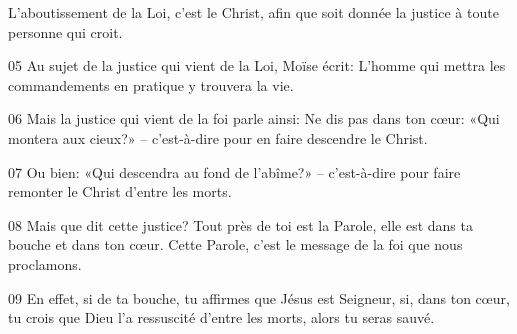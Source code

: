 L’aboutissement de la Loi, c’est le Christ, afin que soit donnée la justice à toute personne qui croit.

05 Au sujet de la justice qui vient de la Loi, Moïse écrit: L’homme qui mettra les commandements en pratique y trouvera la vie.

06 Mais la justice qui vient de la foi parle ainsi: Ne dis pas dans ton cœur: «Qui montera aux cieux?» – c’est-à-dire pour en faire descendre le Christ.

07 Ou bien: «Qui descendra au fond de l’abîme?» – c’est-à-dire pour faire remonter le Christ d’entre les morts.

08 Mais que dit cette justice? Tout près de toi est la Parole, elle est dans ta bouche et dans ton cœur. Cette Parole, c’est le message de la foi que nous proclamons.

09 En effet, si de ta bouche, tu affirmes que Jésus est Seigneur, si, dans ton cœur, tu crois que Dieu l’a ressuscité d’entre les morts, alors tu seras sauvé.
